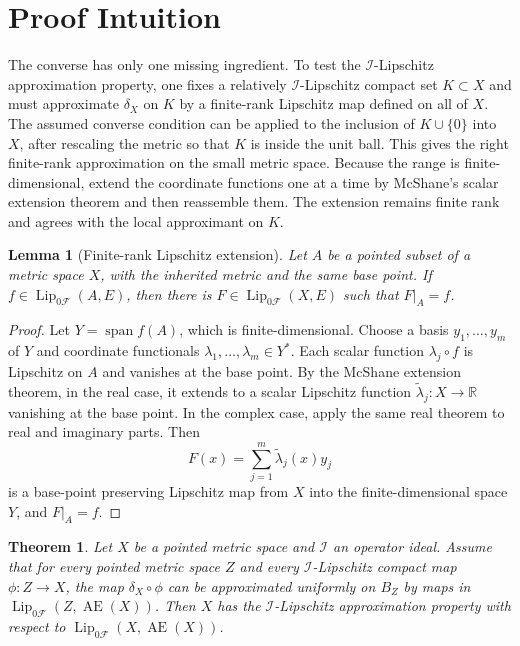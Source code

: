 \documentclass[11pt]{article}
\newtheorem{theorem}{Theorem}
\newtheorem{lemma}{Lemma}
\newcommand{\Lip}{\operatorname{Lip}}
\newcommand{\AEs}{\operatorname{AE}}
\newcommand{\spanop}{\operatorname{span}}
\begin{document}
\section*{Proof Intuition}

The converse has only one missing ingredient.  To test the
\(\mathcal I\)-Lipschitz approximation property, one fixes a relatively
\(\mathcal I\)-Lipschitz compact set \(K\subset X\) and must approximate
\(\delta_X\) on \(K\) by a finite-rank Lipschitz map defined on all of \(X\).
The assumed converse condition can be applied to the inclusion of
\(K\cup\{0\}\) into \(X\), after rescaling the metric so that \(K\) is inside
the unit ball.  This gives the right finite-rank approximation on the small
metric space.  Because the range is finite-dimensional, extend the coordinate
functions one at a time by McShane's scalar extension theorem and then
reassemble them.  The extension remains finite rank and agrees with the local
approximant on \(K\).

\begin{lemma}[Finite-rank Lipschitz extension]
\label{lem:finite-rank-extension}
Let \(A\) be a pointed subset of a metric space \(X\), with the inherited
metric and the same base point.  If \(f\in \Lip_{0\mathcal F}(A,E)\), then
there is \(F\in \Lip_{0\mathcal F}(X,E)\) such that \(F|_A=f\).
\end{lemma}

\begin{proof}
Let \(Y=\spanop f(A)\), which is finite-dimensional.  Choose a basis
\(y_1,\ldots,y_m\) of \(Y\) and coordinate functionals
\(\lambda_1,\ldots,\lambda_m\in Y^*\).  Each scalar function
\(\lambda_j\circ f\) is Lipschitz on \(A\) and vanishes at the base point.
By the McShane extension theorem, in the real case, it extends to a scalar
Lipschitz function \(\widetilde\lambda_j:X\to\mathbb R\) vanishing at the
base point.  In the complex case, apply the same real theorem to real and
imaginary parts.  Then
\[
  F(x)=\sum_{j=1}^m \widetilde\lambda_j(x)y_j
\]
is a base-point preserving Lipschitz map from \(X\) into the finite-dimensional
space \(Y\), and \(F|_A=f\).
\end{proof}

\begin{theorem}
\label{thm:converse}
Let \(X\) be a pointed metric space and \(\mathcal I\) an operator ideal.
Assume that for every pointed metric space \(Z\) and every
\(\mathcal I\)-Lipschitz compact map \(\phi:Z\to X\), the map
\(\delta_X\circ\phi\) can be approximated uniformly on \(B_Z\) by maps in
\(\Lip_{0\mathcal F}(Z,\AEs(X))\).  Then \(X\) has the
\(\mathcal I\)-Lipschitz approximation property with respect to
\(\Lip_{0\mathcal F}(X,\AEs(X))\).
\end{theorem}
\end{document}
